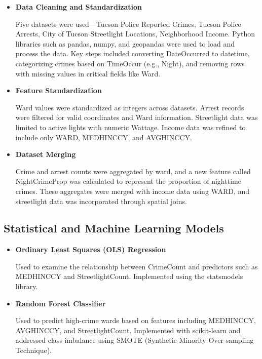 \documentclass{report}
\begin{document}
\begin{itemize}
\item \textbf{Data Cleaning and Standardization}
  \par Five datasets were used—Tucson Police Reported Crimes, Tucson Police Arrests, City of Tucson Streetlight Locations, Neighborhood Income. Python libraries such as pandas, numpy, and geopandas were used to load and process the data. Key steps included converting DateOccurred to datetime, categorizing crimes based on TimeOccur (e.g., Night), and removing rows with missing values in critical fields like Ward.
  
\item \textbf{Feature Standardization}
  \par Ward values were standardized as integers across datasets. Arrest records were filtered for valid coordinates and Ward information. Streetlight data was limited to active lights with numeric Wattage. Income data was refined to include only WARD, MEDHINC\textunderscore CY, and AVGHINC\textunderscore CY.
  
\item \textbf{Dataset Merging}
  \par Crime and arrest counts were aggregated by ward, and a new feature called Night\textunderscore Crime\textunderscore Prop was calculated to represent the proportion of nighttime crimes. These aggregates were merged with income data using WARD, and streetlight data was incorporated through spatial joins.
\end{itemize}

\subsection{Statistical and Machine Learning Models}

\begin{itemize}
\item \textbf{Ordinary Least Squares (OLS) Regression}
  \par Used to examine the relationship between Crime\textunderscore Count and predictors such as MEDHINC\textunderscore CY and Streetlight\textunderscore Count. Implemented using the statsmodels library.
  
\item \textbf{Random Forest Classifier}
  \par Used to predict high-crime wards based on features including MEDHINC\textunderscore CY, AVGHINC\textunderscore CY, and Streetlight\textunderscore Count. Implemented with scikit-learn and addressed class imbalance using SMOTE (Synthetic Minority Over-sampling Technique).
\end{itemize}
\end{document}
